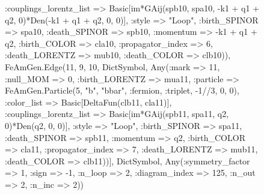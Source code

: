 \documentclass{revtex4}
\begin{document}
\begin{figure}[!htb]
\begin{center}
{:couplings_lorentz_list => Basic[im*GAij(spb10, spa10, -k1 + q1 + q2, 0)*Den(-k1 + q1 + q2, 0, 0)], :style => "Loop", :birth_SPINOR => spa10, :death_SPINOR => spb10, :momentum => -k1 + q1 + q2, :birth_COLOR => cla10, :propagator_index => 6, :death_LORENTZ => mub10, :death_COLOR => clb10)), FeAmGen.Edge(11, 9, 10, Dict{Symbol, Any}(:mark => 11, :null_MOM => 0, :birth_LORENTZ => mua11, :particle => FeAmGen.Particle(5, "b", "bbar", :fermion, :triplet, -1//3, 0, 0), :color_list => Basic[DeltaFun(clb11, cla11)], :couplings_lorentz_list => Basic[im*GAij(spb11, spa11, q2, 0)*Den(q2, 0, 0)], :style => "Loop", :birth_SPINOR => spa11, :death_SPINOR => spb11, :momentum => q2, :birth_COLOR => cla11, :propagator_index => 7, :death_LORENTZ => mub11, :death_COLOR => clb11))], Dict{Symbol, Any}(:symmetry_factor => 1, :sign => -1, :n_loop => 2, :diagram_index => 125, :n_out => 2, :n_inc => 2)) 
}
\end{center}
\end{figure}
\end{document}
